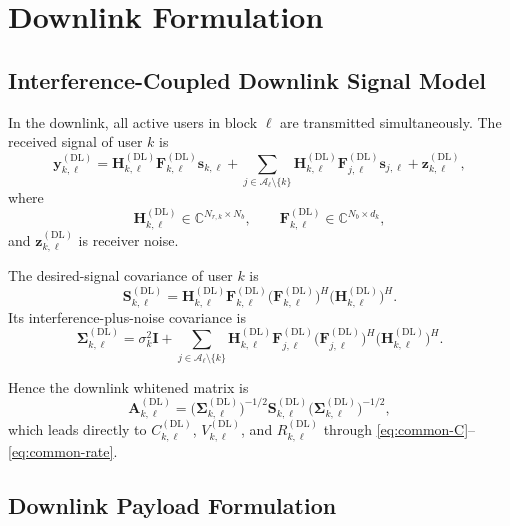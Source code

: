 \documentclass[11pt]{article}
\newcommand{\Aset}{\mathcal{A}}
\newcommand{\C}{\mathbb{C}}
\newcommand{\I}{\mathbf{I}}
\newcommand{\Hc}{\mathbf{H}}
\newcommand{\F}{\mathbf{F}}
\newcommand{\A}{\mathbf{A}}
\newcommand{\Sig}{\mathbf{\Sigma}}
\newcommand{\Smat}{\mathbf{S}}
\newcommand{\DL}{\mathrm{DL}}
\begin{document}
\section{Downlink Formulation}

\subsection{Interference-Coupled Downlink Signal Model}

In the downlink, all active users in block $\ell$ are transmitted
simultaneously. The received signal of user $k$ is
\begin{equation}
\mathbf y_{k,\ell}^{(\DL)}
=
\Hc_{k,\ell}^{(\DL)}\F_{k,\ell}^{(\DL)}\mathbf s_{k,\ell}
+
\sum_{j\in\Aset_\ell\setminus\{k\}}
\Hc_{k,\ell}^{(\DL)}\F_{j,\ell}^{(\DL)}\mathbf s_{j,\ell}
+
\mathbf z_{k,\ell}^{(\DL)},
\label{eq:dl-signal}
\end{equation}
where
\begin{equation}
\Hc_{k,\ell}^{(\DL)} \in \C^{N_{r,k}\times N_b},
\qquad
\F_{k,\ell}^{(\DL)} \in \C^{N_b\times d_k},
\label{eq:dl-dimensions}
\end{equation}
and $\mathbf z_{k,\ell}^{(\DL)}$ is receiver noise.

The desired-signal covariance of user $k$ is
\begin{equation}
\Smat_{k,\ell}^{(\DL)}
=
\Hc_{k,\ell}^{(\DL)}
\F_{k,\ell}^{(\DL)}
\bigl(\F_{k,\ell}^{(\DL)}\bigr)^H
\bigl(\Hc_{k,\ell}^{(\DL)}\bigr)^H.
\label{eq:dl-signal-cov}
\end{equation}
Its interference-plus-noise covariance is
\begin{equation}
\Sig_{k,\ell}^{(\DL)}
=
\sigma_k^2\I
+
\sum_{j\in\Aset_\ell\setminus\{k\}}
\Hc_{k,\ell}^{(\DL)}
\F_{j,\ell}^{(\DL)}
\bigl(\F_{j,\ell}^{(\DL)}\bigr)^H
\bigl(\Hc_{k,\ell}^{(\DL)}\bigr)^H.
\label{eq:dl-disturbance-cov}
\end{equation}

Hence the downlink whitened matrix is
\begin{equation}
\A_{k,\ell}^{(\DL)}
=
\bigl(\Sig_{k,\ell}^{(\DL)}\bigr)^{-1/2}
\Smat_{k,\ell}^{(\DL)}
\bigl(\Sig_{k,\ell}^{(\DL)}\bigr)^{-1/2},
\label{eq:dl-A}
\end{equation}
which leads directly to
$C_{k,\ell}^{(\DL)}$, $V_{k,\ell}^{(\DL)}$, and
$R_{k,\ell}^{(\DL)}$ through
\eqref{eq:common-C}--\eqref{eq:common-rate}.

\subsection{Downlink Payload Formulation}
\end{document}
